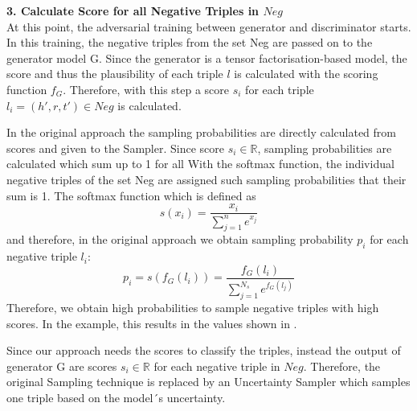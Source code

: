 \textbf{3. Calculate Score for all Negative Triples in $Neg$}\\

At this point, the adversarial training between generator and discriminator starts.
In this training, the negative triples from the set Neg are passed on to the generator model G.
Since the generator is a tensor factorisation-based model, the score and thus the plausibility of each triple $l$ is calculated with the scoring function $f_G$.
Therefore, with this step a score $s_i$ for each triple $l_i = (h',r,t') \in Neg$ is calculated.

In the original \kbgan approach the sampling probabilities are directly calculated from scores and given to the Sampler.
Since score $s_i \in \mathbb{R}$, sampling probabilities are calculated which sum up to 1 for all 
With the softmax function, the individual negative triples of the set Neg are assigned such sampling probabilities that their sum is 1.
The softmax function which is defined as 
\begin{equation}
    s(x_i) = \frac{x_i}{\sum_{j=1}^{n}{e^{x_j}}}
\end{equation}
and therefore, in the  original approach we obtain sampling probability $p_i$ for each negative triple $l_i$:
\begin{equation}
    p_i = s(f_G(l_i)) = \frac{f_G(l_i)}{\sum_{j=1}^{N_s}{e^{f_G(l_j)}}}
\end{equation}
Therefore, we obtain high probabilities to sample negative triples with high scores.
In the example, this results in the values shown in .


Since our approach needs the scores to classify the triples, instead the output of generator G are scores $s_i \in \mathbb{R}$ for each negative triple in $Neg$.
Therefore, the original Sampling technique is replaced by an Uncertainty Sampler which samples one triple based on the model´s uncertainty.


